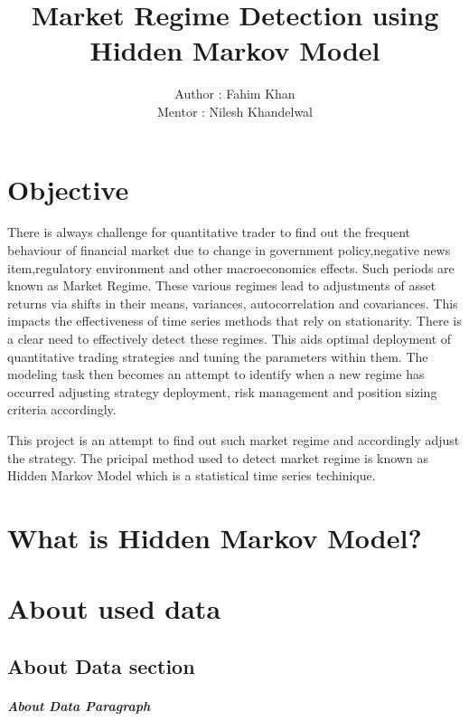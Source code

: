 \documentclass{report}
\author{Author : Fahim Khan \\
		Mentor : Nilesh Khandelwal
}
\title{Market Regime Detection using Hidden Markov Model}
\begin{document}
\maketitle
\tableofcontents



\chapter{Objective}
There is always challenge for quantitative trader to find out the frequent behaviour of financial market due to change in government policy,negative news item,regulatory environment and other macroeconomics effects. Such periods are known as Market Regime.
These various regimes lead to adjustments of asset returns via shifts in their means, variances,
autocorrelation and covariances. This impacts the effectiveness of time series methods that rely
on stationarity.
There is a clear need to effectively detect these regimes. This aids optimal deployment of
quantitative trading strategies and tuning the parameters within them. The modeling task then
becomes an attempt to identify when a new regime has occurred adjusting strategy deployment,
risk management and position sizing criteria accordingly.\par

This project is an attempt to find out such market regime and accordingly adjust the strategy. The pricipal method used to detect market regime is known as Hidden Markov Model which is a statistical time series techinique.


\chapter{What is Hidden Markov Model?}


\chapter{About used data}
\section{About Data section}
\paragraph{About Data Paragraph}
\end{document}
